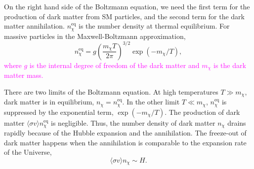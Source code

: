 \documentclass[doublespace,nopageskip]{VTthesis} %
\newcommand{\DS}[1]{\textcolor{magenta}{#1}}
\begin{document}
On the right hand side of the Boltzmann equation, we need the first term for the production of dark matter from SM particles, and the second term for the dark matter annihilation. $n_\chi^{\mathrm{eq}}$ is the number density at thermal equilibrium. For massive particles in the Maxwell-Boltzmann approximation,
\begin{equation}
    n_\chi^{\mathrm{eq}} = g\left( \frac{m_\chi T}{2\pi} \right)^{3/2}\exp(-m_\chi/T),
\end{equation}
\DS{where $g$ is the internal degree of freedom of the dark matter and $m_\chi$ is the dark matter mass.}

There are two limits of the Boltzmann equation. At high temperatures $T \gg m_\chi$, dark matter is in equilibrium, $n_\chi = n_\chi^{\mathrm{eq}}$. In the other limit $T \ll m_\chi$, $n_\chi^{\mathrm{eq}}$ is suppressed by the exponential term, $\exp(-m_\chi/T)$. The production of dark matter $\langle\sigma v\rangle n_\chi^{\mathrm{eq}}$ is negligible. Thus, the number density of dark matter $n_\chi$ drains rapidly because of the Hubble expansion and the annihilation. The freeze-out of dark matter happens when the annihilation is comparable to the expansion rate of the Universe,
\begin{equation}
    \langle\sigma v\rangle n_\chi \sim H.
\end{equation}
\end{document}
